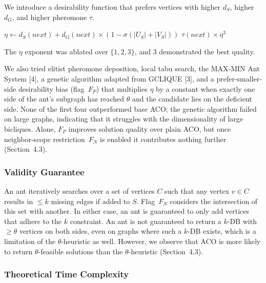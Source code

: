 \documentclass[conference]{IEEEtran}
\begin{document}
We introduce a desirability function that prefers vertices with higher $d_S$, higher $d_G$, and higher pheromone $\tau$.


\begin{algorithm}[H]
\caption{Desirability}
\label{alg:desirability}
\begin{minipage}{\linewidth}
\begin{algorithmic}


   \State $\eta \gets d_S(next) + d_G(next) \times (1 - \sigma(|U_S| + |V_S|))$
   \State \Return $\tau(next) \times \eta^3$
\EndFunction


\end{algorithmic}
\end{minipage}
\end{algorithm}


The $\eta$ exponent was ablated over $\{1, 2, 3\}$, and $3$ demonstrated the best quality.


We also tried elitist pheromone deposition, local tabu search, the MAX-MIN Ant System [4], a genetic algorithm adapted from GCLIQUE [3], and a prefer-smaller-side desirability bias (flag~$F_P$) that multiplies $\eta$ by a constant when exactly one side of the ant's subgraph has reached $\theta$ and the candidate lies on the deficient side. None of the first four outperformed base ACO; the genetic algorithm failed on large graphs, indicating that it struggles with the dimensionality of large bicliques. Alone, $F_P$ improves solution quality over plain ACO, but once neighbor-scope restriction~$F_N$ is enabled it contributes nothing further (Section~4.3).


\subsubsection{Validity Guarantee}


An ant iteratively searches over a set of vertices $C$ such that any vertex $v \in C$ results in $\leq k$ missing edges if added to $S$. Flag~$F_N$ considers the intersection of this set with another. In either case, an ant is guaranteed to only add vertices that adhere to the $k$ constraint. An ant is not guaranteed to return a $k$-DB with $\geq \theta$ vertices on both sides, even on graphs where such a $k$-DB exists, which is a limitation of the $\theta$-heuristic as well. However, we observe that ACO is more likely to return $\theta$-feasible solutions than the $\theta$-heuristic (Section~4.3).


\subsubsection{Theoretical Time Complexity}
\end{document}
